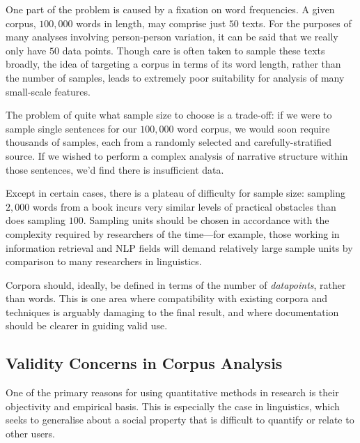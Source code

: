 
One part of the problem is caused by a fixation on word frequencies. A given corpus, $100,000$ words in length, may comprise just $50$ texts. For the purposes of many analyses involving person-person variation, it can be said that we really only have $50$ data points. Though care is often taken to sample these texts broadly, the idea of targeting a corpus in terms of its word length, rather than the number of samples, leads to extremely poor suitability for analysis of many small-scale features.

The problem of quite what sample size to choose is a trade-off: if we were to sample single sentences for our $100,000$ word corpus, we would soon require thousands of samples, each from a randomly selected and carefully-stratified source. If we wished to perform a complex analysis of narrative structure within those sentences, we'd find there is insufficient data.

Except in certain cases, there is a plateau of difficulty for sample size: sampling $2,000$ words from a book incurs very similar levels of practical obstacles than does sampling $100$. Sampling units should be chosen in accordance with the complexity required by researchers of the time---for example, those working in information retrieval and NLP fields will demand relatively large sample units by comparison to many researchers in linguistics.

Corpora should, ideally, be defined in terms of the number of \textsl{datapoints}, rather than words.  This is one area where compatibility with existing corpora and techniques is arguably damaging to the final result, and where documentation should be clearer in guiding valid use.















\subsection{Validity Concerns in Corpus Analysis}
One of the primary reasons for using quantitative methods in research is their objectivity and empirical basis.  This is especially the case in linguistics, which seeks to generalise about a social property that is difficult to quantify or relate to other users.

